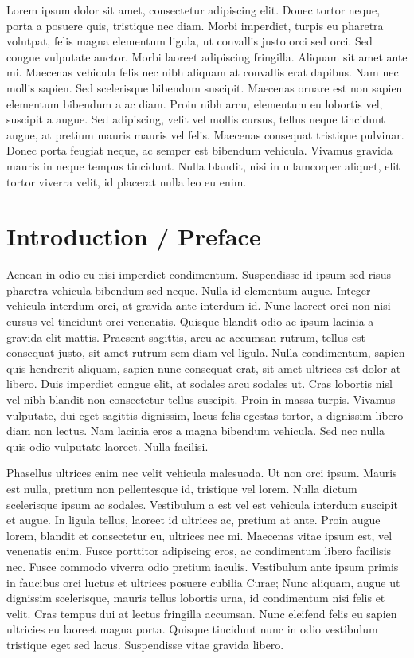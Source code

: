 \documentclass[a4paper,12pt,oneside]{report}
\begin{document}
Lorem ipsum dolor sit amet, consectetur adipiscing elit. Donec tortor neque, porta a posuere quis, tristique nec diam. Morbi imperdiet, turpis eu pharetra volutpat, felis magna elementum ligula, ut convallis justo orci sed orci. Sed congue vulputate auctor. Morbi laoreet adipiscing fringilla. Aliquam sit amet ante mi. Maecenas vehicula felis nec nibh aliquam at convallis erat dapibus. Nam nec mollis sapien. Sed scelerisque bibendum suscipit. Maecenas ornare est non sapien elementum bibendum a ac diam. Proin nibh arcu, elementum eu lobortis vel, suscipit a augue. Sed adipiscing, velit vel mollis cursus, tellus neque tincidunt augue, at pretium mauris mauris vel felis. Maecenas consequat tristique pulvinar. Donec porta feugiat neque, ac semper est bibendum vehicula. Vivamus gravida mauris in neque tempus tincidunt. Nulla blandit, nisi in ullamcorper aliquet, elit tortor viverra velit, id placerat nulla leo eu enim.
\chapter*{Introduction / Preface}

Aenean in odio eu nisi imperdiet condimentum. Suspendisse id ipsum sed risus pharetra vehicula bibendum sed neque. Nulla id elementum augue. Integer vehicula interdum orci, at gravida ante interdum id. Nunc laoreet orci non nisi cursus vel tincidunt orci venenatis. Quisque blandit odio ac ipsum lacinia a gravida elit mattis. Praesent sagittis, arcu ac accumsan rutrum, tellus est consequat justo, sit amet rutrum sem diam vel ligula. Nulla condimentum, sapien quis hendrerit aliquam, sapien nunc consequat erat, sit amet ultrices est dolor at libero. Duis imperdiet congue elit, at sodales arcu sodales ut. Cras lobortis nisl vel nibh blandit non consectetur tellus suscipit. Proin in massa turpis. Vivamus vulputate, dui eget sagittis dignissim, lacus felis egestas tortor, a dignissim libero diam non lectus. Nam lacinia eros a magna bibendum vehicula. Sed nec nulla quis odio vulputate laoreet. Nulla facilisi.

Phasellus ultrices enim nec velit vehicula malesuada. Ut non orci ipsum. Mauris est nulla, pretium non pellentesque id, tristique vel lorem. Nulla dictum scelerisque ipsum ac sodales. Vestibulum a est vel est vehicula interdum suscipit et augue. In ligula tellus, laoreet id ultrices ac, pretium at ante. Proin augue lorem, blandit et consectetur eu, ultrices nec mi. Maecenas vitae ipsum est, vel venenatis enim. Fusce porttitor adipiscing eros, ac condimentum libero facilisis nec. Fusce commodo viverra odio pretium iaculis. Vestibulum ante ipsum primis in faucibus orci luctus et ultrices posuere cubilia Curae; Nunc aliquam, augue ut dignissim scelerisque, mauris tellus lobortis urna, id condimentum nisi felis et velit. Cras tempus dui at lectus fringilla accumsan. Nunc eleifend felis eu sapien ultricies eu laoreet magna porta. Quisque tincidunt nunc in odio vestibulum tristique eget sed lacus. Suspendisse vitae gravida libero.
\end{document}
